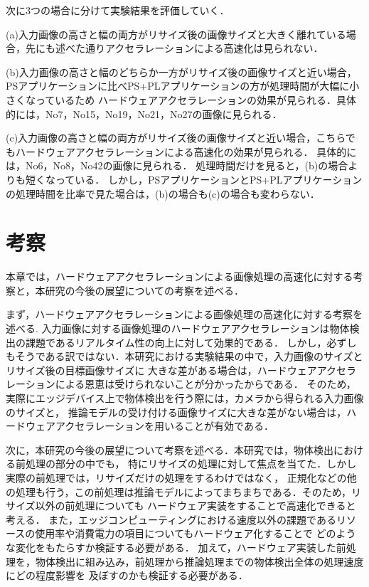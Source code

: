 \documentclass[11pt,a4j]{jreport}
\begin{document}
次に3つの場合に分けて実験結果を評価していく．

(a)入力画像の高さと幅の両方がリサイズ後の画像サイズと大きく離れている場合，先にも述べた通りアクセラレーションによる高速化は見られない．

(b)入力画像の高さと幅のどちらか一方がリサイズ後の画像サイズと近い場合，PSアプリケーションに比べPS+PLアプリケーションの方が処理時間が大幅に小さくなっているため
ハードウェアアクセラレーションの効果が見られる．具体的には，No7，No15，No19，No21，No27の画像に見られる．

(c)入力画像の高さと幅の両方がリサイズ後の画像サイズと近い場合，こちらでもハードウェアアクセラレーションによる高速化の効果が見られる．
具体的には，No6，No8，No42の画像に見られる．
処理時間だけを見ると，(b)の場合よりも短くなっている．
しかし，PSアプリケーションとPS+PLアプリケーションの処理時間を比率で見た場合は，(b)の場合も(c)の場合も変わらない．
%
\chapter{考察}
本章では，ハードウェアアクセラレーションによる画像処理の高速化に対する考察と，本研究の今後の展望についての考察を述べる．

まず，ハードウェアアクセラレーションによる画像処理の高速化に対する考察を述べる.
入力画像に対する画像処理のハードウェアアクセラレーションは物体検出の課題であるリアルタイム性の向上に対して効果的である．
しかし，必ずしもそうである訳ではない．本研究における実験結果の中で，入力画像のサイズとリサイズ後の目標画像サイズに
大きな差がある場合は，ハードウェアアクセラレーションによる恩恵は受けられないことが分かったからである．
そのため，実際にエッジデバイス上で物体検出を行う際には，カメラから得られる入力画像のサイズと，
推論モデルの受け付ける画像サイズに大きな差がない場合は，ハードウェアアクセラレーションを用いることが有効である．

次に，本研究の今後の展望について考察を述べる．本研究では，物体検出における前処理の部分の中でも，
特にリサイズの処理に対して焦点を当てた．しかし実際の前処理では，リサイズだけの処理をするわけではなく，
正規化などの他の処理も行う，この前処理は推論モデルによってまちまちである．そのため，リサイズ以外の前処理についても
ハードウェア実装をすることで高速化できると考える．
また，エッジコンピューティングにおける速度以外の課題であるリソースの使用率や消費電力の項目についてもハードウェア化することで
どのような変化をもたらすか検証する必要がある．
加えて，ハードウェア実装した前処理を，物体検出に組み込み，前処理から推論処理までの物体検出全体の処理速度にどの程度影響を
及ぼすのかも検証する必要がある．
\end{document}

